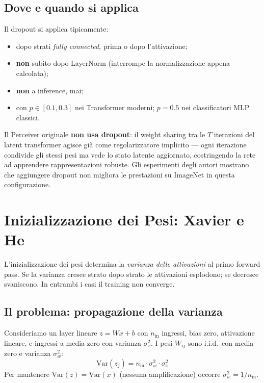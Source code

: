 \documentclass[
  11pt,
]{article}
\begin{document}
\subsection{Dove e quando si applica}

Il dropout si applica tipicamente:
\begin{itemize}
  \item dopo strati \emph{fully connected}, prima o dopo l'attivazione;
  \item \textbf{non} subito dopo LayerNorm (interrompe la normalizzazione appena calcolata);
  \item \textbf{non} a inference, mai;
  \item con $p \in [0.1, 0.3]$ nei Transformer moderni; $p = 0.5$ nei classificatori MLP classici.
\end{itemize}

\begin{notabox}[title={\textbf{Collegamento al Perceiver}}]
Il Perceiver originale \textbf{non usa dropout}: il weight sharing tra le $T$ iterazioni del latent transformer agisce già come regolarizzatore implicito --- ogni iterazione condivide gli stessi pesi ma vede lo stato latente aggiornato, costringendo la rete ad apprendere rappresentazioni robuste. Gli esperimenti degli autori mostrano che aggiungere dropout non migliora le prestazioni su ImageNet in questa configurazione.
\end{notabox}

\section{Inizializzazione dei Pesi: Xavier e He}
\label{app:weight-init}

L'inizializzazione dei pesi determina la \emph{varianza delle attivazioni} al primo forward pass. Se la varianza cresce strato dopo strato le attivazioni esplodono; se decresce svaniscono. In entrambi i casi il training non converge.

\subsection{Il problema: propagazione della varianza}

Consideriamo un layer lineare $z = Wx + b$ con $n_{\text{in}}$ ingressi, bias zero, attivazione lineare, e ingressi a media zero con varianza $\sigma_x^2$. I pesi $W_{ij}$ sono i.i.d.\ con media zero e varianza $\sigma_w^2$:
\[
\text{Var}(z_j) = n_{\text{in}} \cdot \sigma_w^2 \cdot \sigma_x^2
\]
Per mantenere $\text{Var}(z) = \text{Var}(x)$ (nessuna amplificazione) occorre $\sigma_w^2 = 1/n_{\text{in}}$.
\end{document}

